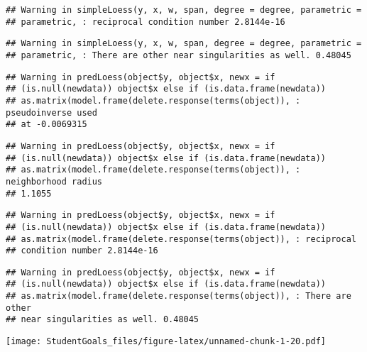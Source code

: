 \documentclass[]{article}
\begin{document}
\begin{verbatim}
## Warning in simpleLoess(y, x, w, span, degree = degree, parametric =
## parametric, : reciprocal condition number 2.8144e-16
\end{verbatim}

\begin{verbatim}
## Warning in simpleLoess(y, x, w, span, degree = degree, parametric =
## parametric, : There are other near singularities as well. 0.48045
\end{verbatim}

\begin{verbatim}
## Warning in predLoess(object$y, object$x, newx = if
## (is.null(newdata)) object$x else if (is.data.frame(newdata))
## as.matrix(model.frame(delete.response(terms(object)), : pseudoinverse used
## at -0.0069315
\end{verbatim}

\begin{verbatim}
## Warning in predLoess(object$y, object$x, newx = if
## (is.null(newdata)) object$x else if (is.data.frame(newdata))
## as.matrix(model.frame(delete.response(terms(object)), : neighborhood radius
## 1.1055
\end{verbatim}

\begin{verbatim}
## Warning in predLoess(object$y, object$x, newx = if
## (is.null(newdata)) object$x else if (is.data.frame(newdata))
## as.matrix(model.frame(delete.response(terms(object)), : reciprocal
## condition number 2.8144e-16
\end{verbatim}

\begin{verbatim}
## Warning in predLoess(object$y, object$x, newx = if
## (is.null(newdata)) object$x else if (is.data.frame(newdata))
## as.matrix(model.frame(delete.response(terms(object)), : There are other
## near singularities as well. 0.48045
\end{verbatim}

\texttt{[image: StudentGoals\_files/figure-latex/unnamed-chunk-1-20.pdf]}
\end{document}
